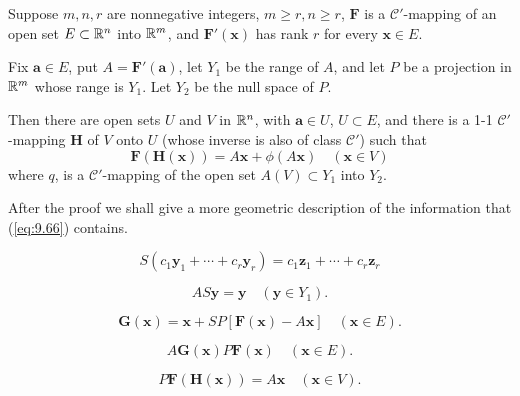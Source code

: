 \begin{thm}
    \label{thm:9.32}
    Suppose $m, n, r$ are nonnegative integers, $m \geq r, n \geq r$, 
    $\mathbf{F}$ is a $\mathscr{C}'$-mapping of an open set $E \subset {\protect\mathbb R}^n$ into ${\protect\mathbb R}^m$, 
    and $\mathbf{F'(x)}$ has rank $r$ for every $\mathbf{x} \in E$.

    Fix $\mathbf{a} \in E$, put $A = \mathbf{F'(a)}$, 
    let $Y_1$ be the range of $A$, 
    and let $P$ be a projection in ${\protect\mathbb R}^m$ whose range is $Y_1$. 
    Let $Y_2$ be the null space of $P$.

    Then there are open sets $U$ and $V$ in ${\protect\mathbb R}^n$, 
    with $\mathbf{a} \in U$, $U \subset E$, 
    and there is a 1-1 $\mathscr{C'}$-mapping $\mathbf{H}$ of $V$ onto $U$ 
    (whose inverse is also of class $\mathscr{C'}$) such that
    \begin{equation}
        \label{eq:9.66}
        \mathbf{F(H(x))} = A\mathbf{x} + \phi(A\mathbf{x})
        \quad 
        (\mathbf{x} \in V)
    \end{equation}
    where $q$, is a $\mathscr{C'}$-mapping of the open set $A(V) \subset Y_1$ into $Y_2$.
\end{thm}

After the proof we shall give a more geometric description of the information that (\ref{eq:9.66}) contains.



\begin{equation}
    \label{eq:9.67}
    S( c_1 \mathbf{y}_1 + \cdots + c_r \mathbf{y}_r ) =
    c_1 \mathbf{z}_1 + \cdots + c_r \mathbf{z}_r 
\end{equation}


\begin{equation}
    \label{eq:9.68}
    AS \mathbf{y} = \mathbf{y} 
    \quad 
    (\mathbf{y} \in Y_1).
\end{equation}

\begin{equation}
    \label{eq:9.69}
    \mathbf{G(x)} = 
    \mathbf{x} + SP[\mathbf{F(x)}-A\mathbf{x}]
    \quad 
    (\mathbf{x} \in E).
\end{equation}


\begin{equation}
    \label{eq:9.70}
    A \mathbf{G(x)} 
    P \mathbf{F(x)} 
    \quad 
    (\mathbf{x} \in E).
\end{equation}

\begin{equation}
    \label{eq:9.71}
    P \mathbf{F(H(x))} = A \mathbf{x} 
    \quad 
    (\mathbf{x} \in V).
\end{equation}

